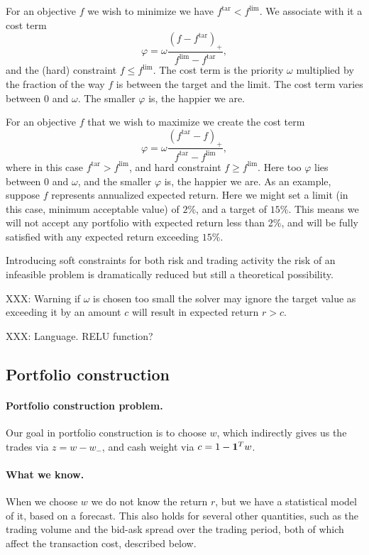 \documentclass[12pt]{article}
\begin{document}
For an objective $f$ we wish to minimize we have $f^\mathrm{tar} < f^\mathrm{lim}$.
We associate with it a cost term
\[
\varphi = \omega \frac{(f-f^\mathrm{tar})_+}{f^\mathrm{lim}-f^\mathrm{tar}},
\]
and the (hard) constraint $f \leq f^\mathrm{lim}$.
The cost term is the priority $\omega$ multiplied by the fraction
of the way $f$ is between the target and the limit.
The cost term varies between $0$ and $\omega$.
The smaller $\varphi$ is, the happier we are.

For an objective $f$ that we wish to maximize we create the cost term
\[
\varphi = \omega \frac{(f^\mathrm{tar}-f)_+}{f^\mathrm{tar}-f^\mathrm{lim}},
\]
where in this case $f^\mathrm{tar} > f^\mathrm{lim}$, and hard constraint
$f \geq f^\mathrm{lim}$.
Here too $\varphi$ lies between $0$ and $\omega$,
and the smaller $\varphi$ is, the happier we are.
As an example, suppose $f$ represents annualized expected return.
Here we might set a limit
(in this case, minimum acceptable value) of $2\%$, and a target of $15\%$.
This means we will not accept any portfolio with expected return less than 2\%,
and will be fully satisfied with any expected return exceeding $15\%$.

Introducing soft constraints for both risk and trading activity the
risk of an infeasible problem is dramatically reduced but still a theoretical possibility.

XXX: Warning if $\omega$ is chosen too small the solver may ignore the target value
as exceeding it by an amount $c$ will result in expected return $r > c$.

XXX: Language. RELU function?

\subsection{Portfolio construction}
\paragraph{Portfolio construction problem.}
Our goal in portfolio construction is to choose $w$, which indirectly gives us 
the trades via $z=w-w_-$, and cash weight via $c=1-\mathbf 1^T w$.

\paragraph{What we know.}
When we choose $w$ we do not know the return $r$, but we have a 
statistical model of it, based on a forecast.  
This also holds for several other quantities, such as the
trading volume and the bid-ask spread over the trading period,
both of which affect the transaction cost, described below.
\end{document}
